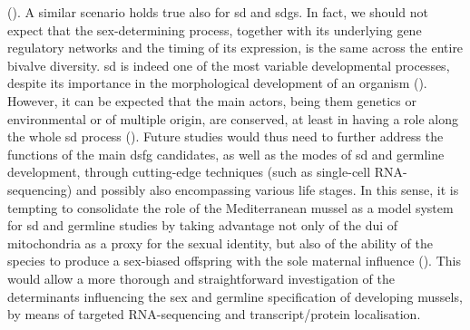 (). A similar scenario holds true also for \gls{sd} and \glspl{sdg}. In fact, we should not expect that the sex-determining process, together with its underlying gene regulatory networks and the timing of its expression, is the same across the entire bivalve diversity. \gls{sd} is indeed one of the most variable developmental processes, despite its importance in the morphological development of an organism (). However, it can be expected that the main actors, being them genetics or environmental or of multiple origin, are conserved, at least in having a role along the whole \gls{sd} process (). Future studies would thus need to further address the functions of the main \gls{dsfg} candidates, as well as the modes of \gls{sd} and germline development, through cutting-edge techniques (such as single-cell RNA-sequencing) and possibly also encompassing various life stages. In this sense, it is tempting to consolidate the role of the Mediterranean mussel as a model system for \gls{sd} and germline studies by taking advantage not only of the \gls{dui} of mitochondria as a proxy for the sexual identity, but also of the ability of the species to produce a sex-biased offspring with the sole maternal influence (). This would allow a more thorough and straightforward investigation of the determinants influencing the sex and germline specification of developing mussels, by means of targeted RNA-sequencing and transcript/protein localisation.

% 
